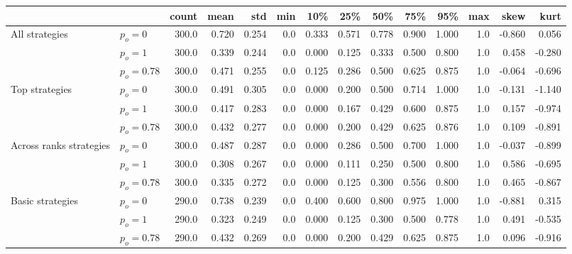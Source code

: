 \begin{tabular}{llrrrrrrrrrrrr}
\toprule
                 &            &  count &   mean &    std &  min &    10\% &    25\% &    50\% &    75\% &    95\% &  max &   skew &   kurt \\
\midrule
All strategies & $p_o=0$ &  300.0 &  0.720 &  0.254 &  0.0 &  0.333 &  0.571 &  0.778 &  0.900 &  1.000 &  1.0 & -0.860 &  0.056 \\
                 & $p_o=1$ &  300.0 &  0.339 &  0.244 &  0.0 &  0.000 &  0.125 &  0.333 &  0.500 &  0.800 &  1.0 &  0.458 & -0.280 \\
                 & $p_o=0.78$ &  300.0 &  0.471 &  0.255 &  0.0 &  0.125 &  0.286 &  0.500 &  0.625 &  0.875 &  1.0 & -0.064 & -0.696 \\
                 \midrule
Top strategies & $p_o=0$ &  300.0 &  0.491 &  0.305 &  0.0 &  0.000 &  0.200 &  0.500 &  0.714 &  1.000 &  1.0 & -0.131 & -1.140 \\
                 & $p_o=1$ &  300.0 &  0.417 &  0.283 &  0.0 &  0.000 &  0.167 &  0.429 &  0.600 &  0.875 &  1.0 &  0.157 & -0.974 \\
                 & $p_o=0.78$ &  300.0 &  0.432 &  0.277 &  0.0 &  0.000 &  0.200 &  0.429 &  0.625 &  0.876 &  1.0 &  0.109 & -0.891 \\
                 \midrule
Across ranks strategies & $p_o=0$ &  300.0 &  0.487 &  0.287 &  0.0 &  0.000 &  0.286 &  0.500 &  0.700 &  1.000 &  1.0 & -0.037 & -0.899 \\
                 & $p_o=1$ &  300.0 &  0.308 &  0.267 &  0.0 &  0.000 &  0.111 &  0.250 &  0.500 &  0.800 &  1.0 &  0.586 & -0.695 \\
                 & $p_o=0.78$ &  300.0 &  0.335 &  0.272 &  0.0 &  0.000 &  0.125 &  0.300 &  0.556 &  0.800 &  1.0 &  0.465 & -0.867 \\
                 \midrule
Basic strategies & $p_o=0$ &  290.0 &  0.738 &  0.239 &  0.0 &  0.400 &  0.600 &  0.800 &  0.975 &  1.000 &  1.0 & -0.881 &  0.315 \\
                 & $p_o=1$ &  290.0 &  0.323 &  0.249 &  0.0 &  0.000 &  0.125 &  0.300 &  0.500 &  0.778 &  1.0 &  0.491 & -0.535 \\
                 & $p_o=0.78$ &  290.0 &  0.432 &  0.269 &  0.0 &  0.000 &  0.200 &  0.429 &  0.625 &  0.875 &  1.0 &  0.096 & -0.916 \\
\bottomrule
\end{tabular}
